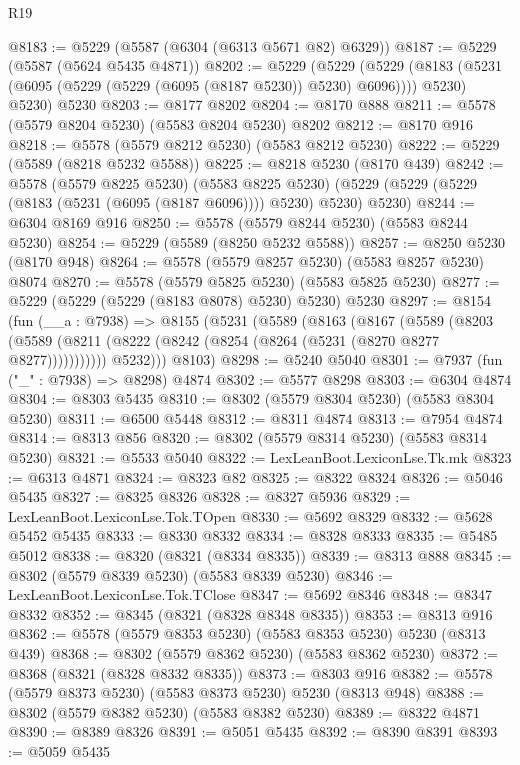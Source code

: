 \begin{lexlean}{R19}
\begin{coremodule}
@8183 := @5229 (@5587 (@6304 (@6313 @5671 @82) @6329))
@8187 := @5229 (@5587 (@5624 @5435 @4871))
@8202 := @5229
    (@5229
      (@5229 (@8183 (@5231 (@6095 (@5229 (@5229 (@6095 (@8187 @5230)) @5230) @6096)))) @5230)
      @5230)
    @5230
@8203 := @8177 @8202
@8204 := @8170 @888
@8211 := @5578 (@5579 @8204 @5230) (@5583 @8204 @5230) @8202
@8212 := @8170 @916
@8218 := @5578 (@5579 @8212 @5230) (@5583 @8212 @5230)
@8222 := @5229 (@5589 (@8218 @5232 @5588))
@8225 := @8218 @5230 (@8170 @439)
@8242 := @5578
    (@5579 @8225 @5230)
    (@5583 @8225 @5230)
    (@5229 (@5229 (@5229 (@8183 (@5231 (@6095 (@8187 @6096)))) @5230) @5230) @5230)
@8244 := @6304 @8169 @916
@8250 := @5578 (@5579 @8244 @5230) (@5583 @8244 @5230)
@8254 := @5229 (@5589 (@8250 @5232 @5588))
@8257 := @8250 @5230 (@8170 @948)
@8264 := @5578 (@5579 @8257 @5230) (@5583 @8257 @5230) @8074
@8270 := @5578 (@5579 @5825 @5230) (@5583 @5825 @5230)
@8277 := @5229 (@5229 (@5229 (@8183 @8078) @5230) @5230) @5230
@8297 := @8154
    (fun (__a : @7938) =>
    @8155
      (@5231
        (@5589
          (@8163
            (@8167
              (@5589
                (@8203
                  (@5589 (@8211 (@8222 (@8242 (@8254 (@8264 (@5231 (@8270 @8277 @8277)))))))))))
            @5232)))
      @8103)
@8298 := @5240 @5040
@8301 := @7937 (fun ("_" : @7938) => @8298) @4874
@8302 := @5577 @8298
@8303 := @6304 @4874
@8304 := @8303 @5435
@8310 := @8302 (@5579 @8304 @5230) (@5583 @8304 @5230)
@8311 := @6500 @5448
@8312 := @8311 @4874
@8313 := @7954 @4874
@8314 := @8313 @856
@8320 := @8302 (@5579 @8314 @5230) (@5583 @8314 @5230)
@8321 := @5533 @5040
@8322 := LexLeanBoot.LexiconLse.Tk.mk
@8323 := @6313 @4871
@8324 := @8323 @82
@8325 := @8322 @8324
@8326 := @5046 @5435
@8327 := @8325 @8326
@8328 := @8327 @5936
@8329 := LexLeanBoot.LexiconLse.Tok.TOpen
@8330 := @5692 @8329
@8332 := @5628 @5452 @5435
@8333 := @8330 @8332
@8334 := @8328 @8333
@8335 := @5485 @5012
@8338 := @8320 (@8321 (@8334 @8335))
@8339 := @8313 @888
@8345 := @8302 (@5579 @8339 @5230) (@5583 @8339 @5230)
@8346 := LexLeanBoot.LexiconLse.Tok.TClose
@8347 := @5692 @8346
@8348 := @8347 @8332
@8352 := @8345 (@8321 (@8328 @8348 @8335))
@8353 := @8313 @916
@8362 := @5578 (@5579 @8353 @5230) (@5583 @8353 @5230) @5230 (@8313 @439)
@8368 := @8302 (@5579 @8362 @5230) (@5583 @8362 @5230)
@8372 := @8368 (@8321 (@8328 @8332 @8335))
@8373 := @8303 @916
@8382 := @5578 (@5579 @8373 @5230) (@5583 @8373 @5230) @5230 (@8313 @948)
@8388 := @8302 (@5579 @8382 @5230) (@5583 @8382 @5230)
@8389 := @8322 @4871
@8390 := @8389 @8326
@8391 := @5051 @5435
@8392 := @8390 @8391
@8393 := @5059 @5435

\end{coremodule}
\end{lexlean}

